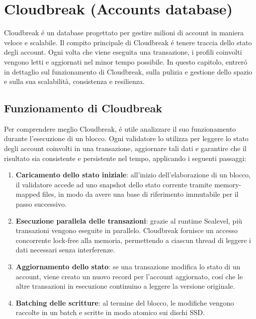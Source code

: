 \documentclass[a4paper,12pt]{report}
\begin{document}
	\section{Cloudbreak (Accounts database)}
	Cloudbreak é un database progettato per gestire milioni di account in maniera veloce e scalabile. Il compito principale di Cloudbreak é tenere traccia dello stato degli account. Ogni volta che viene eseguita una transazione, i profili coinvolti vengono letti e aggiornati nel minor tempo possibile. In questo capitolo, entreró in dettaglio sul funzionamento di Cloudbreak, sulla pulizia e gestione dello spazio e sulla sua scalabilità, consistenza e resilienza.
	
	\subsection{Funzionamento di Cloudbreak}
	Per comprendere meglio Cloudbreak, é utile analizzare il suo funzionamento durante l'esecuzione di un blocco. Ogni validatore lo utilizza per leggere lo stato degli account coinvolti in una transazione, aggiornare tali dati e garantire che il risultato sia consistente e persistente nel tempo, applicando i seguenti passaggi:
	\begin{enumerate}
		\item \textbf{Caricamento dello stato iniziale}: all'inizio dell'elaborazione di un blocco, il validatore accede ad uno snapshot dello stato corrente tramite memory-mapped files, in modo da avere una base di riferimento immutabile per il passo successivo.
		\item \textbf{Esecuzione parallela delle transazioni}: grazie al runtime Sealevel, più transazioni vengono eseguite in parallelo. Cloudbreak fornisce un accesso concorrente lock-free alla memoria, permettendo a ciascun thread di leggere i dati necessari senza interferenze.
		\item \textbf{Aggiornamento dello stato}: se una transazione modifica lo stato di un account, viene creato un nuovo record per l'account aggiornato, cosí che le altre transazioni in esecuzione continuino a leggere la versione originale.
		\item \textbf{Batching delle scritture}: al termine del blocco, le modifiche vengono raccolte in un batch e scritte in modo atomico sui dischi SSD.
	\end{enumerate}
	
\end{document}
